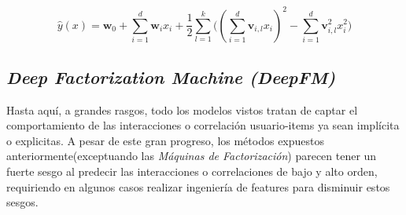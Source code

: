 \documentclass[11pt,a4paper,twoside]{thesis}
\begin{document}
\begin{equation}
	\hat{y}(x) = \mathbf{w}_0 + \sum_{i=1}^d \mathbf{w}_i x_i + \frac{1}{2} \sum_{l=1}^k \big ((\sum_{i=1}^d \mathbf{v}_{i, l} x_i)^2 - \sum_{i=1}^d \mathbf{v}_{i, l}^2 x_i^2)
\end{equation}

\clearpage

\subsection{\textit{Deep Factorization Machine (DeepFM)}}

Hasta aquí, a grandes rasgos, todo los modelos vistos tratan de captar el
comportamiento de las interacciones o correlación usuario-items ya sean
implícita o explicitas. A pesar de este gran progreso, los métodos expuestos
anteriormente(exceptuando las \textit{Máquinas de Factorización}) parecen tener
un fuerte sesgo al predecir las interacciones o correlaciones de bajo y alto
orden, requiriendo en algunos casos realizar ingeniería de features para
disminuir estos sesgos.
\end{document}
